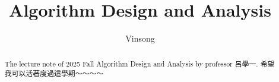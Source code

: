 \documentclass[a4paper]{report}
\author{Vinsong}
\title{Algorithm Design and Analysis}
\begin{document}
\maketitle

\begin{abstract}
    The lecture note of 2025 Fall Algorithm Design and Analysis by professor 呂學一. 希望我可以活著度過這學期～～～～
\end{abstract}

\newpage

\tableofcontents

\setcounter{chapter}{-1}

\end{document}
